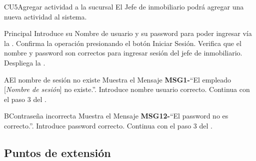 \begin{UseCase}{CU5}{Agregar actividad a la sucursal}{
		El Jefe de inmobiliario podrá agregar una nueva actividad al sistema.
	}
\end{UseCase}
\begin{UCtrayectoria}{Principal}
	\UCpaso[\UCactor] Introduce su Nombre de usuario y su password para poder ingresar vía la  \label{CU1LoginJI}.
	\UCpaso[\UCactor] Confirma la operación presionando el botón Iniciar Sesión.
	\UCpaso Verifica que el nombre y password son correctos para ingresar sesión del jefe de inmobiliario.
	\UCpaso Despliega la .
\end{UCtrayectoria}

\begin{UCtrayectoriaA}{A}{El nombre de sesión no existe}
	\UCpaso[\UCactor] Muestra el Mensaje {\bf MSG1-}``El empleado [{\em Nombre de sesión}] no existe.''.
	\UCpaso[\UCactor] Introduce nombre usuario correcto.
	\UCpaso[] Continua con el paso 3 del .
\end{UCtrayectoriaA}

\begin{UCtrayectoriaA}{B}{Contraseña incorrecta}
	\UCpaso Muestra el Mensaje {\bf MSG12-}``El password no es correcto.''.
	\UCpaso[\UCactor] Introduce password correcto.
	\UCpaso[] Continua con el paso 3 del .
\end{UCtrayectoriaA}


\subsection{Puntos de extensión}

